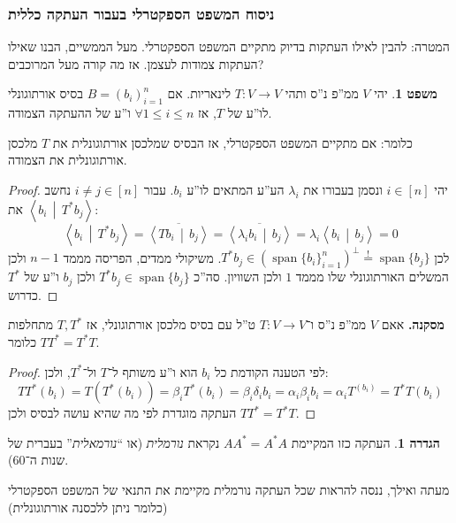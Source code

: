 \documentclass[a4paper]{article}
\newcommand\ra    {\rangle}
\newcommand\la    {\langle}
\newcommand\seq   {\overset{!}{=}}
\newcommand\ol    {\overline}
\DeclareMathOperator{\Sp}      {span}
\newcommand\co        {\colon}
\newcommand\mut [2]   {\left \la #1 \,\middle\vert\, #2 \right \ra}
\newcommand\ag        {\alpha}
\newcommand\bg        {\beta}
\newcommand\dg        {\delta}
\renewcommand\lg      {\lambda}
\theoremstyle{definition}
\newtheorem{Theorem}{\color{myblue}משפט}
\newtheorem{Definition}{\color{mygreen}הגדרה}
\newcommand\theo  [1] {\begin{Theorem}#1\end{Theorem}}
\newcommand\defi  [1] {\begin{Definition}#1\end{Definition}}
\begin{document}
	
	\subsubsection{ניסוח המשפט הספקטרלי בעבור העתקה כללית}
	
	המטרה: להבין לאילו העתקות בדיוק מתקיים המשפט הספקטרלי. מעל הממשיים, הבנו שאילו העתקות צמודות לעצמן. אז מה קורה מעל המרוכבים? 
	
	\theo{יהי $V$ ממ''פ נ''ס ותהי $T \co V \to V$ לינאריות. אם $B = (b_i)_{i = 1}^{n}$ בסיס אורתוגונלי לו''ע של $T$, אז $\forall 1 \le i \le n$ ו''ע של ההעתקה הצמודה. }
	כלומר: אם מתקיים המשפט הספקטרלי, אז הבסיס שמלכסן אורתוגונלית את $T$ מלכסן אורתוגונלית את הצמודה. 
	\begin{proof}
		יהי $i \in [n]$ ונסמן בעבורו את $\lg_i$ הע''ע המתאים לו''ע $b_i$. עבור $i \neq j \in [n]$ נחשב את $\mut{b_i}{T^*b_j}$: 
		\[ \mut{b_i}{T^*b_j} = \ol{\mut{Tb_i}{b_j}} = \ol{\mut{\lg _i b_i}{b_j}} = \lg_i \mut{b_i}{b_j} = 0 \]
		לכן $T^*b_j \in (\Sp\{b_i\}_{i = 1}^{n})^{\perp} \seq \Sp\{b_j\}$. משיקולי ממדים, הפריסה מממד $n - 1$ ולכן המשלים האורתוגונלי שלו מממד $1$ ולכן השוויון. סה''כ $T^* b_j \in \Sp\{b_j\}$ ולכן $b_j$ ו''ע של $T^*$ כדרוש. 
	\end{proof}
	
	\textbf{מסקנה. }אאם $V$ ממ''פ נ''ס ו־$T \co V \to V$ ט''ל עם בסיס מלכסן אורתוגונלי, אז $T, T^*$ מתחלפות כלומר $TT^* = T^*T$. \begin{proof}
		לפי הטענה הקודמת כל $b_i$ הוא ו''ע משותף ל־$T$ ול־$T^*$, ולכן: 
		\[ TT^*(b_i) = T(T^*(b_i)) = \bg_i T^*(b_i) = \bg_i \dg_i b_i = \ag_i \bg_i b_i = \ag_i T^(b_i) = T^*T(b_i) \]
		העתקה מוגדרת לפי מה שהיא עושה לבסיס ולכן $TT^* = T^*T$. 
	\end{proof}
	\defi{העתקה כזו המקיימת $AA^* = A^*A$ נקראת \textit{נורמלית} (או ``\textit{נורמאלית}'' בעברית של שנות ה־60). }
	
	מעתה ואילך, ננסה להראות שכל העתקה נורמלית מקיימת את התנאי של המשפט הספקטרלי (כלומר ניתן ללכסנה אורתוגונלית)
	
\end{document}
